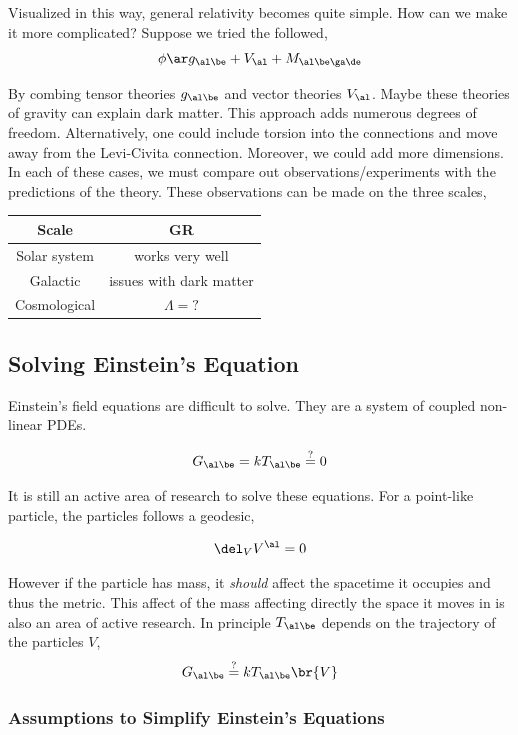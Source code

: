 \documentclass{article}
\begin{document}
Visualized in this way, general relativity becomes quite simple. How can we make it more complicated? Suppose we tried the followed,
\[ \phi \ar g_{\al\be} + V_{\al} + M_{\al\be\ga\de} \]

By combing tensor theories $g_{\al\be}$ and vector theories $V_{\al}$. Maybe these theories of gravity can explain dark matter. This approach adds numerous degrees of freedom. Alternatively, one could include torsion into the connections and move away from the Levi-Civita connection. Moreover, we could add more dimensions. \\

In each of these cases, we must compare out observations/experiments with the predictions of the theory. These observations can be made on the three scales,

\begin{center}
\begin{tabular}{|c|c|}
    \hline
    \textbf{Scale} & \textbf{GR} \\
    \hline
    Solar system & works very well \\
    Galactic & issues with dark matter \\
    Cosmological & $\Lambda = ?$ \\
    \hline
\end{tabular}
\end{center}

\subsection{Solving Einstein's Equation}
Einstein's field equations are difficult to solve. They are a system of coupled non-linear PDEs.

\[ G_{\al\be} = k T_{\al\be} \stackrel{?}{=} 0 \]

It is still an active area of research to solve these equations. For a point-like particle, the particles follows a geodesic,

\[ \del_V V^\al = 0 \]

However if the particle has mass, it \textit{should} affect the spacetime it occupies and thus the metric. This affect of the mass affecting directly the space it moves in is also an area of active research. In principle $T_{\al\be}$ depends on the trajectory of the particles $V$,
\[ G_{\al\be} \stackrel{?}{=} k T_{\al\be} \br{V} \]

\subsubsection{Assumptions to Simplify Einstein's Equations}
\end{document}
